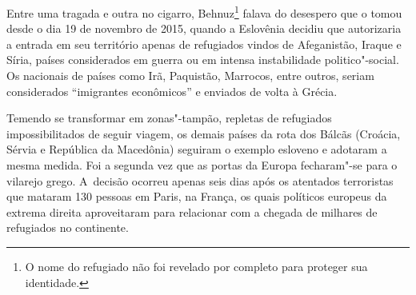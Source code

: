 \putodd{}
\clearpage


 

Entre uma tragada e outra no cigarro, Behnuz\footnote{ O nome do refugiado não foi revelado por completo
para proteger sua identidade.} falava do
desespero que o tomou desde o dia 19 de novembro de 2015, quando a
Eslovênia decidiu que autorizaria a entrada em seu território apenas de
refugiados vindos de Afeganistão, Iraque e Síria, países considerados em
guerra ou em intensa instabilidade politico"-social. Os nacionais de
países como Irã, Paquistão, Marrocos, entre outros, seriam considerados
``imigrantes econômicos'' e enviados de volta à Grécia.

Temendo se transformar em zonas"-tampão, repletas de refugiados
impossibilitados de seguir viagem, os demais países da rota dos Bálcãs
(Croácia, Sérvia e República da Macedônia) seguiram o exemplo esloveno e
adotaram a mesma medida. Foi a segunda vez que as portas da Europa
fecharam"-se para o vilarejo grego. A~decisão ocorreu apenas seis dias
após os atentados terroristas que mataram 130 pessoas em Paris, na
França, os quais políticos europeus da extrema direita aproveitaram para
relacionar com a chegada de milhares de refugiados no continente.

